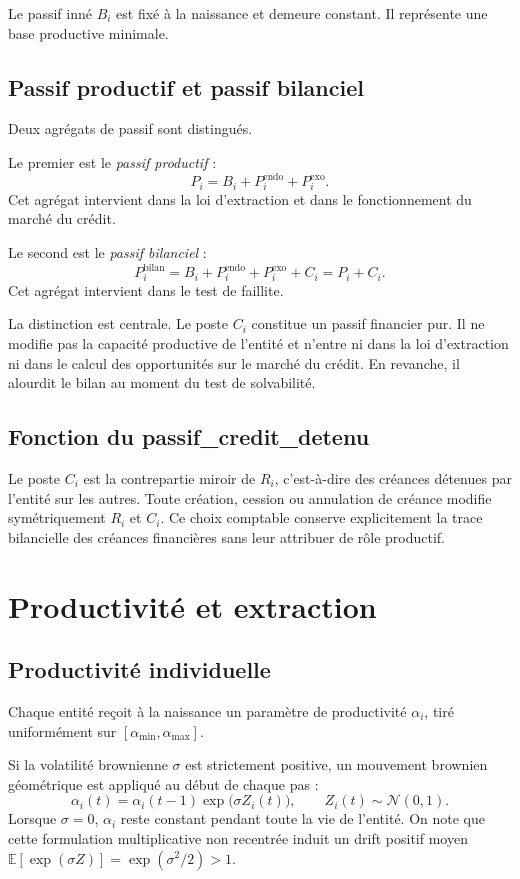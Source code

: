 \documentclass[11pt,a4paper]{article}
\begin{document}
Le passif inné \(B_i\) est fixé à la naissance et demeure constant. Il représente une base productive minimale.

\subsection{Passif productif et passif bilanciel}

Deux agrégats de passif sont distingués.

Le premier est le \emph{passif productif} :
\[
P_i = B_i + P_i^{\mathrm{endo}} + P_i^{\mathrm{exo}}.
\]
Cet agrégat intervient dans la loi d'extraction et dans le fonctionnement du marché du crédit.

Le second est le \emph{passif bilanciel} :
\[
P_i^{\mathrm{bilan}} = B_i + P_i^{\mathrm{endo}} + P_i^{\mathrm{exo}} + C_i = P_i + C_i.
\]
Cet agrégat intervient dans le test de faillite.

La distinction est centrale. Le poste \(C_i\) constitue un passif financier pur. Il ne modifie pas la capacité productive de l'entité et n'entre ni dans la loi d'extraction ni dans le calcul des opportunités sur le marché du crédit. En revanche, il alourdit le bilan au moment du test de solvabilité.

\subsection{Fonction du passif\_credit\_detenu}

Le poste \(C_i\) est la contrepartie miroir de \(R_i\), c'est-à-dire des créances détenues par l'entité sur les autres. Toute création, cession ou annulation de créance modifie symétriquement \(R_i\) et \(C_i\). Ce choix comptable conserve explicitement la trace bilancielle des créances financières sans leur attribuer de rôle productif.

\section{Productivité et extraction}

\subsection{Productivité individuelle}

Chaque entité reçoit à la naissance un paramètre de productivité \(\alpha_i\), tiré uniformément sur \([\alpha_{\min},\alpha_{\max}]\).

Si la volatilité brownienne \(\sigma\) est strictement positive, un mouvement brownien géométrique est appliqué au début de chaque pas :
\[
\alpha_i(t) = \alpha_i(t-1)\exp\!\bigl(\sigma Z_i(t)\bigr),
\qquad Z_i(t)\sim\mathcal N(0,1).
\]
Lorsque \(\sigma=0\), \(\alpha_i\) reste constant pendant toute la vie de l'entité. On note que cette formulation multiplicative non recentrée induit un drift positif moyen \(\mathbb E[\exp(\sigma Z)]=\exp(\sigma^2/2)>1\).
\end{document}
